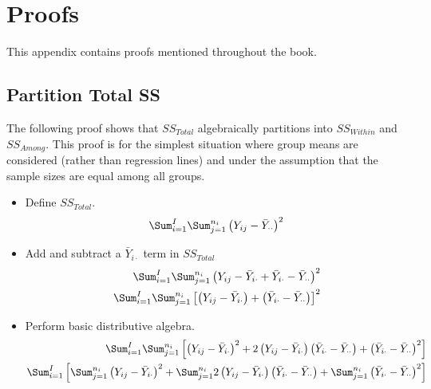 \chapter{Proofs}
\vspace{-40pt}
This appendix contains proofs mentioned throughout the book.

\section{Partition Total SS} \label{app:ProofSSPartition}
The following proof shows that $SS_{Total}$ algebraically partitions into $SS_{Within}$ and $SS_{Among}$.  This proof is for the simplest situation where group means are considered (rather than regression lines) and under the assumption that the sample sizes are equal among all groups.
\begin{itemize}
  \item Define $SS_{Total}$.
    \[\Sum_{i=1}^{I}\Sum_{j=1}^{n_{i}}\left(Y_{ij}-\bar{Y}_{\cdot\cdot}\right)^{2} \]

  \item Add and subtract a $\bar{Y}_{i\cdot}$ term in $SS_{Total}$
    \[ \begin{split}
      \Sum_{i=1}^{I}\Sum_{j=1}^{n_{i}}\left(Y_{ij}-\bar{Y}_{i\cdot}+\bar{Y}_{i\cdot}-\bar{Y}_{\cdot\cdot}\right)^{2} \\
      \Sum_{i=1}^{I}\Sum_{j=1}^{n_{i}}\left[\left(Y_{ij}-\bar{Y}_{i\cdot}\right)+\left(\bar{Y}_{i\cdot}-\bar{Y}_{\cdot\cdot}\right)\right]^{2} \\
    \end{split} \]

  \item Perform basic distributive algebra.
    \[ \begin{split}
      \Sum_{i=1}^{I}\Sum_{j=1}^{n_{i}}\left[\left(Y_{ij}-\bar{Y}_{i\cdot}\right)^{2}+2\left(Y_{ij}-\bar{Y}_{i\cdot}\right)\left(\bar{Y}_{i\cdot}-\bar{Y}_{\cdot\cdot}\right)+\left(\bar{Y}_{i\cdot}-\bar{Y}_{\cdot\cdot}\right)^{2}\right] \\
      \Sum_{i=1}^{I}\left[\Sum_{j=1}^{n_{i}}\left(Y_{ij}-\bar{Y}_{i\cdot}\right)^{2}+\Sum_{j=1}^{n_{i}}2\left(Y_{ij}-\bar{Y}_{i\cdot}\right)\left(\bar{Y}_{i\cdot}-\bar{Y}_{\cdot\cdot}\right)+\Sum_{j=1}^{n_{i}}\left(\bar{Y}_{i\cdot}-\bar{Y}_{\cdot\cdot}\right)^{2}\right] \\
    \end{split} \]


\end{itemize}
